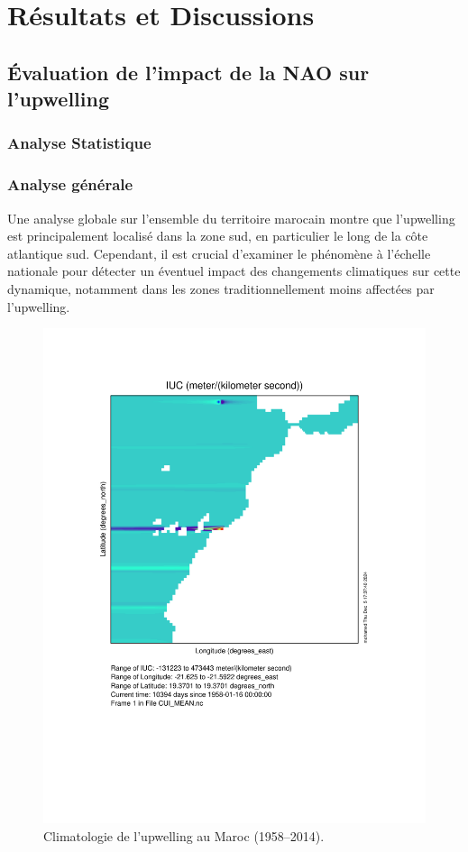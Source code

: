 \section{Résultats et Discussions}

\subsection{Évaluation de l'impact de la NAO sur l'upwelling}
\subsubsection{Analyse Statistique}
\subsubsection*{Analyse générale}
Une analyse globale sur l’ensemble du territoire marocain montre que l’upwelling est principalement localisé dans la zone sud, en particulier le long de la côte atlantique sud. Cependant, il est crucial d'examiner le phénomène à l'échelle nationale pour détecter un éventuel impact des changements climatiques sur cette dynamique, notamment dans les zones traditionnellement moins affectées par l'upwelling.

\begin{figure}[H]
\centering
\includegraphics[scale=0.5]{ncview_output.pdf}
\caption{Climatologie de l'upwelling au Maroc (1958–2014).}
\label{fig:climatologie_upwelling}
\end{figure}

